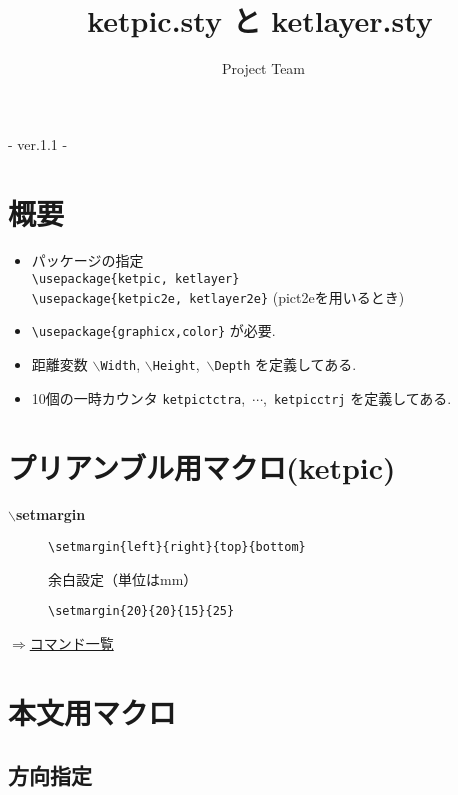 \documentclass[a4j,12pt,dvipdfmx]{ujarticle}
\newcommand{\bs}{$\backslash$}
\newenvironment{cmd}[2]{%
\hypertarget{#2}{}
\begin{center}{\bf\large #1}\end{center}
\begin{description}
}{
\end{description}
\begin{flushright} \hyperlink{functionlist}{$\Rightarrow$コマンド一覧}\end{flushright}
}
\newcommand{\itemketj}[1]{
\item[\Ltab{15mm}{#1}]
}
\begin{document}
\title{{\bf\huge ketpic.sty と ketlayer.sty}}
\author{\ketcindy\ Project Team}
\maketitle

\begin{center}  - ver.1.1 -\end{center}


\section{概要}

\begin{itemize}
\item パッケージの指定\\
\quad\verb|\usepackage{ketpic, ketlayer}|\\
\quad\verb|\usepackage{ketpic2e, ketlayer2e}| (pict2eを用いるとき)
\item \verb|\usepackage{graphicx,color}| が必要.
\item 距離変数 \bs\verb|Width|, \bs\verb|Height|,\ \bs\verb|Depth| を定義してある.
\item 10個の一時カウンタ \verb|ketpictctra|,\ $\cdots$,\ \verb|ketpicctrj| を定義してある.
\end{itemize}

\section{プリアンブル用マクロ(ketpic)}
\vspace{\baselineskip}
\begin{cmd}{\bs setmargin}{setmargin}
\itemketj{使用法}\verb|\setmargin{left}{right}{top}{bottom}|
\itemketj{説明}余白設定（単位はmm）
\itemketj{例}\verb|\setmargin{20}{20}{15}{25}|
\end{cmd}

\section{本文用マクロ}

\subsection{方向指定}
\end{document}

